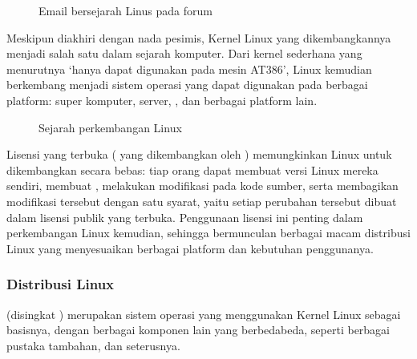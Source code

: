 \documentclass[letterpaper,10pt,english]{sphinxmanual}
\let\sphinxpxdimen\pdfpxdimen\else\newdimen\sphinxpxdimen
\begin{document}
\begin{figure}[htbp]
\centering
\capstart

\noindent\sphinxincludegraphics[height=500\sphinxpxdimen]{{2020-12-01-22-47-51}.png}
\caption{Email bersejarah Linus pada forum }\label{\detokenize{sesi1/pengantarlinux:linus-email}}\end{figure}

Meskipun diakhiri dengan nada pesimis, Kernel Linux yang dikembangkannya menjadi salah satu  dalam sejarah komputer. Dari kernel sederhana yang menurutnya ‘hanya dapat digunakan pada mesin AT\sphinxhyphen{}386’, Linux kemudian berkembang menjadi sistem operasi yang dapat digunakan pada berbagai platform: super komputer, server, , dan berbagai platform lain.

\begin{figure}[htbp]
\centering
\capstart

\noindent{}
\caption{Sejarah perkembangan Linux}\label{\detokenize{sesi1/pengantarlinux:sejarah-linux}}\end{figure}

Lisensi yang terbuka ( yang dikembangkan oleh ) memungkinkan Linux untuk dikembangkan secara bebas: tiap orang dapat membuat versi Linux mereka sendiri, membuat , melakukan modifikasi pada kode sumber, serta membagikan modifikasi tersebut dengan satu syarat, yaitu setiap perubahan tersebut dibuat dalam lisensi publik yang terbuka. Penggunaan lisensi ini penting dalam perkembangan Linux kemudian, sehingga bermunculan berbagai macam distribusi Linux yang menyesuaikan berbagai platform dan kebutuhan penggunanya.


\subsubsection{Distribusi Linux}
\label{\detokenize{sesi1/pengantarlinux:distribusi-linux}}
 (disingkat ) merupakan sistem operasi yang menggunakan Kernel Linux sebagai basisnya, dengan berbagai komponen lain yang berbeda\sphinxhyphen{}beda, seperti  berbagai pustaka tambahan, dan seterusnya.
\end{document}
